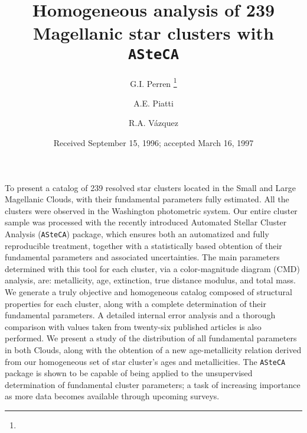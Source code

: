 \documentclass{aa}
\begin{document}
 

\title{Homogeneous analysis of 239 Magellanic star clusters with \texttt
{ASteCA}}
\subtitle{}

   \author{G.I. Perren
          \thanks{}
          \and
          A.E. Piatti
          \and
          R.A. V\'azquez
          }


   \date{Received September 15, 1996; accepted March 16, 1997}

 
\abstract
{}
{To present a catalog of 239 resolved star clusters located in the Small and
Large Magellanic Clouds, with their fundamental parameters fully estimated. All
the clusters were observed in the Washington photometric system.}
{Our entire cluster sample was processed with the recently introduced Automated
Stellar Cluster Analysis (\texttt{ASteCA}) package, which ensures both an
automatized and fully reproducible treatment, together with a statistically
based obtention of their fundamental parameters and associated uncertainties.
%
The main parameters determined with this tool for each cluster, via a
color-magnitude diagram (CMD) analysis, are: metallicity, age, extinction, true
distance modulus, and total mass.}
{We generate a truly objective and homogeneous catalog composed of structural
properties for each cluster, along with a complete determination of their
fundamental parameters.
%
A detailed internal error analysis and a thorough comparison with values taken
from twenty-six published articles is also performed.
%
We present a study of the distribution of all fundamental parameters in
both Clouds, along with the obtention of a new age-metallicity relation derived
from our homogeneous set of star cluster's ages and metallicities.}
{The \texttt{ASteCA} package is shown to be capable of being applied to the
unsupervised determination of fundamental cluster parameters; a task of
increasing importance as more data becomes available through upcoming surveys.}
\end{document}
